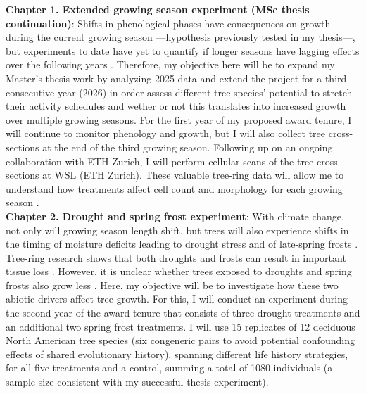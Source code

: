 \documentclass[12pt]{article}
\begin{document}
\textbf{Chapter 1. Extended growing season experiment (MSc thesis continuation)}:
Shifts in phenological phases have consequences on growth during the current growing season ---hypothesis previously tested in my thesis---, but experiments to date have yet to quantify if longer seasons have lagging effects over the following years \citep{chapin_ecology_1990,landhausser_partitioning_2012,lawrence_variable_2018,martens_first-year_2007,schott_premature_2013}. Therefore, my objective here will be to expand my Master's thesis work by analyzing 2025 data and extend the project for a third consecutive year (2026) in order assess different tree species’ potential to stretch their activity schedules and wether or not this translates into increased growth over multiple growing seasons. For the first year of my proposed award tenure, I will continue to monitor phenology and growth, but I will also collect tree cross-sections at the end of the third growing season. Following up on an ongoing collaboration with ETH Zurich, I will perform cellular scans of the tree cross-sections at WSL (ETH Zurich). These valuable tree-ring data will allow me to understand how treatments affect cell count and morphology for each growing season \citep{silvestro_longer_2023}. \\
\textbf{Chapter 2. Drought and spring frost experiment}:
With climate change, not only will growing season length shift, but trees will also experience shifts in the timing of moisture deficits leading to drought stress and of late-spring frosts \citep{dox_wood_2022}. Tree-ring research shows that both droughts and frosts can result in important tissue loss \citep{kramer_why_2012,baumgarten_no_2023,kramer_why_2012,dandrea_winters_2019}. However, it is unclear whether trees exposed to droughts and spring frosts also grow less \citep{chamberlain_late_2021,baumgarten_no_2023}. 
Here, my objective will be to investigate how these two abiotic drivers affect tree growth. For this, I will conduct an experiment during the second year of the award tenure that consists of three drought treatments and an additional two spring frost treatments. I will use 15 replicates of 12 deciduous North American tree species (six congeneric pairs to avoid potential confounding effects of shared evolutionary history), spanning different life history strategies, for all five treatments and a control, summing a total of 1080 individuals (a sample size consistent with my successful thesis experiment). 
\end{document}
